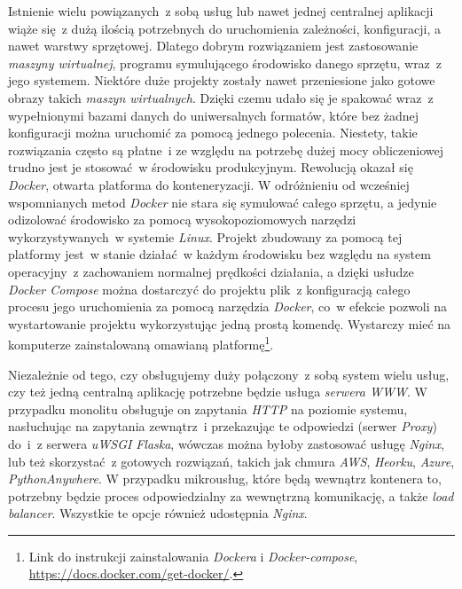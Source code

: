 Istnienie wielu powiązanych~z sobą usług lub nawet jednej centralnej aplikacji wiąże się~z dużą ilością potrzebnych do uruchomienia zależności, konfiguracji, a nawet warstwy sprzętowej\cite{Ziade:2018}. Dlatego dobrym rozwiązaniem jest zastosowanie \textit{maszyny wirtualnej}, programu symulującego środowisko danego sprzętu, wraz~z jego systemem. Niektóre duże projekty zostały nawet przeniesione jako gotowe obrazy takich \textit{maszyn wirtualnych}. Dzięki czemu udało się je spakować wraz~z wypełnionymi bazami danych do uniwersalnych formatów, które bez żadnej konfiguracji można uruchomić za pomocą jednego polecenia\cite{Ziade:2018}. Niestety, takie rozwiązania często są płatne~i ze względu na potrzebę dużej mocy obliczeniowej trudno jest je stosować~w środowisku produkcyjnym\cite{Ziade:2018}. Rewolucją okazał się \textit{Docker}, otwarta platforma do konteneryzacji. W odróżnieniu od wcześniej wspomnianych metod \textit{Docker} nie stara się symulować całego sprzętu, a jedynie odizolować środowisko za pomocą wysokopoziomowych narzędzi wykorzystywanych~w systemie \textit{Linux}. Projekt zbudowany za pomocą tej platformy jest~w stanie działać~w każdym środowisku bez względu na system operacyjny~z zachowaniem normalnej prędkości działania\cite{Ziade:2018}, a dzięki usłudze \textit{Docker Compose} można dostarczyć do projektu plik~z konfiguracją\cite{docker} całego procesu jego uruchomienia za pomocą narzędzia \textit{Docker}, co~w efekcie pozwoli na wystartowanie projektu wykorzystując jedną prostą komendę. Wystarczy mieć na komputerze zainstalowaną omawianą platformę\footnote{Link do instrukcji zainstalowania \textit{Dockera} i \textit{Docker-compose}, \url{https://docs.docker.com/get-docker/}.}.

Niezależnie od tego, czy obsługujemy duży połączony~z sobą system wielu usług, czy też jedną centralną aplikację potrzebne będzie usługa \textit{serwera WWW}. W przypadku monolitu obsługuje on zapytania \textit{HTTP} na poziomie systemu, nasłuchując na zapytania zewnątrz~i przekazując te odpowiedzi (serwer \textit{Proxy}\cite{nginx}) do~i~z serwera \textit{uWSGI} \textit{Flaska}, wówczas można byłoby zastosować usługę \textit{Nginx}\cite{flask}, lub też skorzystać~z gotowych rozwiązań, takich jak chmura \textit{AWS}, \textit{Heorku}, \textit{Azure}, \textit{PythonAnywhere}\cite{flask}. W przypadku mikrousług, które będą wewnątrz kontenera to, potrzebny będzie proces odpowiedzialny za wewnętrzną komunikację, a także \textit{load balancer}. Wszystkie te opcje również udostępnia \textit{Nginx}\cite{nginx}.

